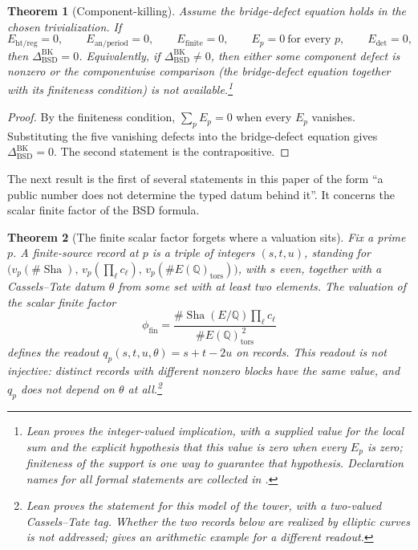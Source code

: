 \documentclass[11pt]{article}
\newtheorem{theorem}{Theorem}[section]
\theoremstyle{definition}
\newcommand{\Q}{\mathbb{Q}}
\newcommand{\Sha}{\operatorname{Sha}}
\newcommand{\tors}{\operatorname{tors}}
\begin{document}
\begin{theorem}[Component-killing]
\label{thm:apparatus:component-killing}
Assume the bridge-defect equation holds in the chosen trivialization.  If
\[
  E_{\mathrm{ht/reg}}=0,\qquad
  E_{\mathrm{an/period}}=0,\qquad
  E_{\mathrm{finite}}=0,\qquad
  E_p=0\ \text{for every }p,\qquad
  E_{\det}=0,
\]
then $\Delta_{\mathrm{BSD}}^{\mathrm{BK}}=0$.  Equivalently, if
$\Delta_{\mathrm{BSD}}^{\mathrm{BK}}\neq 0$, then either some component
defect is nonzero or the componentwise comparison (the bridge-defect
equation together with its finiteness condition) is not available.\footnote{Lean proves the integer-valued implication, with a supplied
value for the local sum and the explicit hypothesis that this value is
zero when every $E_p$ is zero; finiteness of the support is one way to
guarantee that hypothesis.  Declaration names for all formal statements
are collected in .}
\end{theorem}

\begin{proof}
By the finiteness condition, $\sum_pE_p=0$ when every $E_p$ vanishes.
Substituting the five vanishing defects into the bridge-defect equation
gives $\Delta_{\mathrm{BSD}}^{\mathrm{BK}}=0$.  The second statement is
the contrapositive.
\end{proof}

The next result is the first of several statements in this paper of the
form ``a public number does not determine the typed datum behind it''.  It
concerns the scalar finite factor of the BSD formula.

\begin{theorem}[The finite scalar factor forgets where a valuation sits]
\label{thm:apparatus:finite-scalar-public-shadow}
Fix a prime $p$.  A \emph{finite-source record} at $p$ is a triple of
integers $(s,t,u)$, standing for
$\bigl(v_p(\#\Sha),\,v_p(\prod_\ell c_\ell),\,v_p(\#E(\Q)_{\tors})\bigr)$,
with $s$ even, together with a Cassels--Tate datum $\theta$ from some set
with at least two elements.  The valuation of the scalar finite factor
\[
  \phi_{\mathrm{fin}}
  =
  \frac{\#\Sha(E/\Q)\prod_\ell c_\ell}{\#E(\Q)_{\tors}^{\,2}}
\]
defines the readout $q_p(s,t,u,\theta)=s+t-2u$ on records.  This readout
is not injective: distinct records with different nonzero blocks have the
same value, and $q_p$ does not depend on $\theta$ at all.\footnote{Lean proves the statement for this model of the tower, with a
two-valued Cassels--Tate tag.  Whether the two records below are realized
by elliptic curves is not addressed;  gives an
arithmetic example for a different readout.}
\end{theorem}
\end{document}
